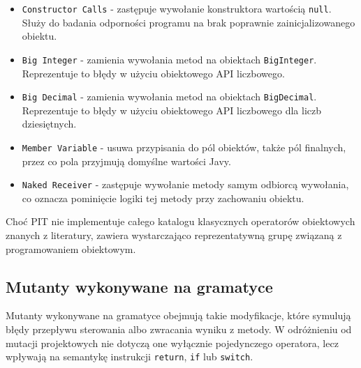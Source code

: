 \documentclass[12pt,a4paper,oldfontcommands]{memoir}
\theoremstyle{plain}
\theoremstyle{definition}
\theoremstyle{remark}
\begin{document}
    \begin{itemize}
        \item \texttt{Constructor Calls} - zastępuje wywołanie konstruktora wartością \texttt{null}. Służy do badania odporności programu na brak poprawnie zainicjalizowanego obiektu.
        \item \texttt{Big Integer} - zamienia wywołania metod na obiektach \texttt{BigInteger}. Reprezentuje to błędy w użyciu obiektowego API liczbowego.
        \item \texttt{Big Decimal} - zamienia wywołania metod na obiektach \texttt{BigDecimal}. Reprezentuje to błędy w użyciu obiektowego API liczbowego dla liczb dziesiętnych.
        \item \texttt{Member Variable} - usuwa przypisania do pól obiektów, także pól finalnych, przez co pola przyjmują domyślne wartości Javy.
        \item \texttt{Naked Receiver} - zastępuje wywołanie metody samym odbiorcą wywołania, co oznacza pominięcie logiki tej metody przy zachowaniu obiektu.
    \end{itemize}

    Choć PIT nie implementuje całego katalogu klasycznych operatorów obiektowych znanych z literatury, zawiera wystarczająco reprezentatywną grupę związaną z programowaniem obiektowym.

    \subsection{Mutanty wykonywane na gramatyce}

    Mutanty wykonywane na gramatyce obejmują takie modyfikacje, które symulują błędy przepływu sterowania albo zwracania wyniku z metody.
    W odróżnieniu od mutacji projektowych nie dotyczą one wyłącznie pojedynczego operatora, lecz wpływają na semantykę instrukcji \texttt{return}, \texttt{if} lub \texttt{switch}.
\end{document}
